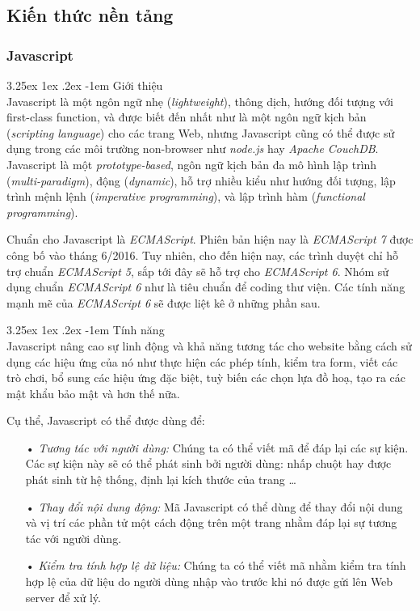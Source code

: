 \documentclass[12pt,a4paper,twoside]{article}
\makeatletter
\newcommand{\myparagraph}[1]{\paragraph{#1}\mbox{}\\} %
\renewcommand\paragraph{\@startsection{paragraph}{5}{\z@}%
  {3.25ex \@plus1ex \@minus.2ex}%
  {-1em}%
  {\normalfont\normalsize\bfseries}}
\makeatother
\begin{document}
\subsection{Kiến thức nền tảng}
\subsubsection{Javascript}
\myparagraph{Giới thiệu}
Javascript là một ngôn ngữ nhẹ (\textit{lightweight}), thông dịch, hướng đối tượng với first-class function, và được biết đến nhất như là một ngôn ngữ kịch bản (\textit{scripting language}) cho các trang Web, nhưng Javascript cũng có thể được sử dụng trong các môi trường non-browser như \textit{node.js} hay \textit{Apache CouchDB}. Javascript là một \textit{prototype-based}, ngôn ngữ kịch bản đa mô hình lập trình (\textit{multi-paradigm}), động (\textit{dynamic}), hỗ trợ nhiều kiểu như hướng đối tượng, lập trình mệnh lệnh (\textit{imperative programming}), và lập trình hàm (\textit{functional programming}).

Chuẩn cho Javascript là \textit{ECMAScript}. Phiên bản hiện nay là \textit{ECMAScript 7} được công bố vào tháng 6/2016. Tuy nhiên, cho đến hiện nay, các trình duyệt chỉ hỗ trợ chuẩn \textit{ECMAScript 5}, sắp tới đây sẽ hỗ trợ cho \textit{ECMAScript 6}. Nhóm sử dụng chuẩn \textit{ECMAScript 6} như là tiêu chuẩn để coding thư viện. Các tính năng mạnh mẽ của \textit{ECMAScript 6} sẽ được liệt kê ở những phần sau.

\myparagraph{Tính năng}
Javascript nâng cao sự linh động và khả năng tương tác cho website bằng cách sử dụng các hiệu ứng của nó như thực hiện các phép tính, kiểm tra form, viết các trò chơi, bổ sung các hiệu ứng đặc biệt, tuỳ biến các chọn lựa đồ hoạ, tạo ra các mật khẩu bảo mật và hơn thế nữa.

Cụ thể, Javascript có thể được dùng để:
\begin{itemize}
\item[•] \emph{Tương tác với người dùng:} Chúng ta có thể viết mã để đáp lại các sự kiện. Các sự kiện này sẽ có thể phát sinh bởi người dùng: nhấp chuột hay được phát sinh từ hệ thống, định lại kích thước của trang …
\item[•] \emph{Thay đổi nội dung động:} Mã Javascript có thể dùng để thay đổi nội dung và vị trí các phần tử một cách động trên một trang nhằm đáp lại sự tương tác với người dùng.
\item[•] \emph{Kiểm tra tính hợp lệ dữ liệu:} Chúng ta có thể viết mã nhằm kiểm tra tính hợp lệ của dữ liệu do người dùng nhập vào trước khi nó được gửi lên Web server để xử lý.
\end{itemize}
\end{document}
